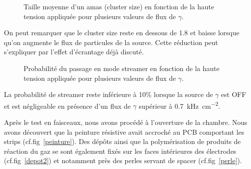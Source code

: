 \begin{figure}[!ht]
	\centering
	\caption{Taille moyenne d'un amas (cluster size) en fonction de la haute tension appliquée pour plusieurs valeurs de flux de $\gamma$.}
	\label{clustersize}
\end{figure}

On peut remarquer que le cluster size reste en dessous de \num{1.8} et baisse lorsque qu'on augmente le flux de particules de la source. Cette réduction peut s'expliquer par l'effet d'écrantage déjà discuté.

\begin{figure}[!ht]
	\centering
	\caption{Probabilité du passage en mode streamer en fonction de la haute tension appliquée pour plusieurs valeurs de flux de $\gamma$.}
	\label{probastreamer}
\end{figure}

La probabilité de streamer reste inférieure à 10\% lorsque la source de $\gamma$ est OFF et est négligeable en présence d'un flux de $\gamma$ supérieur à \SI{0.7}{\kilo\hertz\per\square\centi\meter}.

Après le test en faisceaux, nous avons procédé à l'ouverture de la chambre. Nous avons découvert que la peinture résistive avait accroché au PCB comportant les strips (cf.fig~\ref{peinture}). Des dépôts ainsi que la polymérisation de produits de réaction du gaz se sont également fixés sur les faces intérieures des électrodes (cf.fig~\ref{depot2}) et notamment près des perles servant de spacer (cf.fig~\ref{perle}). 

